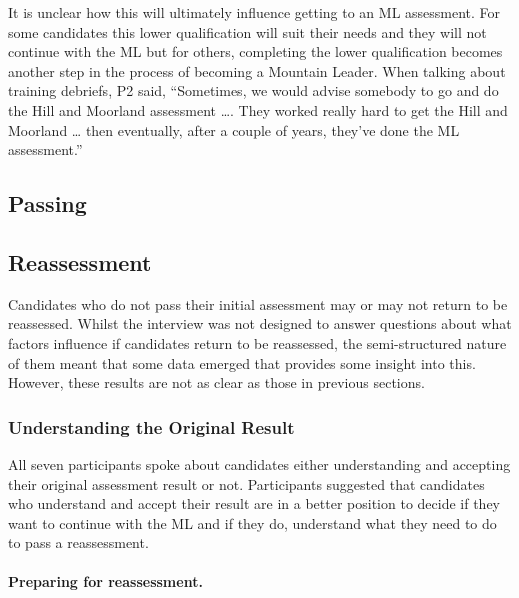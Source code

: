 \documentclass[a4paper,]{book}
\let\oldparagraph\paragraph
\renewcommand{\paragraph}[1]{\oldparagraph{#1}\mbox{}}
\begin{document}
It is unclear how this will ultimately influence getting to an ML assessment. For some candidates this lower qualification will suit their needs and they will not continue with the ML but for others, completing the lower qualification becomes another step in the process of becoming a Mountain Leader. When talking about training debriefs, P2 said, ``Sometimes, we would advise somebody to go and do the Hill and Moorland assessment \ldots{}. They worked really hard to get the Hill and Moorland \ldots{} then eventually, after a couple of years, they've done the ML assessment.''

\hypertarget{passing}{%
\subsection{Passing}\label{passing}}

\hypertarget{reassessment}{%
\subsection{Reassessment}\label{reassessment}}

Candidates who do not pass their initial assessment may or may not return to be reassessed. Whilst the interview was not designed to answer questions about what factors influence if candidates return to be reassessed, the semi-structured nature of them meant that some data emerged that provides some insight into this. However, these results are not as clear as those in previous sections.

\hypertarget{understanding-the-original-result}{%
\subsubsection{Understanding the Original Result}\label{understanding-the-original-result}}

All seven participants spoke about candidates either understanding and accepting their original assessment result or not. Participants suggested that candidates who understand and accept their result are in a better position to decide if they want to continue with the ML and if they do, understand what they need to do to pass a reassessment.

\hypertarget{preparing-for-reassessment.}{%
\paragraph{Preparing for reassessment.}\label{preparing-for-reassessment.}}
\end{document}
